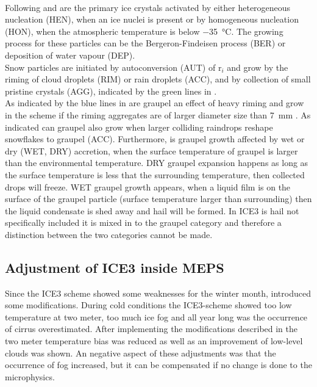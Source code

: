 \\
Following \cite{pinty_mixed-phased_1998} and  are the primary ice crystals activated by either heterogeneous nucleation (HEN), when an ice nuclei is present or by homogeneous nucleation (HON), when the atmospheric temperature is below \SI{-35}{\celsius}. The growing process for these particles can be the Bergeron-Findeisen process (BER) or deposition of water vapour (DEP). \\
Snow particles are initiated by autoconversion (AUT) of r$_i$ and grow by the riming of cloud droplets (RIM) or rain droplets (ACC), and by collection of small pristine crystals (AGG), indicated by the green lines in . \\
As indicated by the blue lines in  are graupel an effect of heavy riming and grow in the scheme if the riming aggregates are of larger diameter size than \SI{7}{\mm} \citep{meteo_france_meso-nh_2009}. As indicated can graupel also grow when larger colliding raindrops reshape snowflakes to graupel (ACC). Furthermore, is graupel growth affected by wet or dry (WET, DRY) accretion, when the surface temperature of graupel is larger than the environmental temperature. DRY graupel expansion happens as long as the surface temperature is less that the surrounding temperature, then collected drops will freeze. WET graupel growth appears, when a liquid film is on the surface of the graupel particle (surface temperature larger than surrounding) then the liquid condensate is shed away and hail will be formed. In ICE3 is hail not specifically included it is mixed in to the graupel category and therefore a distinction between the two categories cannot be made. 

%



%
\subsection{Adjustment of ICE3 inside MEPS}
Since the ICE3 scheme showed some weaknesses for the winter month, introduced \cite{muller_arome-metcoop:_2017} some modifications. 
During cold conditions the ICE3-scheme showed too low temperature at two meter, too much ice fog and all year long was the occurrence of cirrus overestimated. After implementing the modifications described in \cite{muller_arome-metcoop:_2017} the two meter temperature bias was reduced as well as an improvement of low-level clouds was shown. An negative aspect of these adjustments was that the occurrence of fog increased, but it can be compensated if no change is done to the microphysics. 



